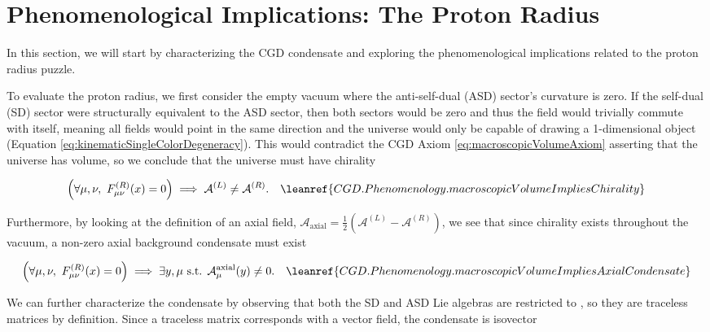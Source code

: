 
\section{Phenomenological Implications: The Proton Radius}
\label{sec:ProtonRadius}

In this section, we will start by characterizing the CGD condensate and exploring the phenomenological implications related to the proton radius puzzle.

To evaluate the proton radius, we first consider the empty vacuum where the anti-self-dual (ASD) sector's curvature is zero. If the self-dual (SD) sector were structurally equivalent to the ASD sector, then both sectors would be zero and thus the field would trivially commute with itself, meaning all fields would point in the same direction and the universe would only be capable of drawing a 1-dimensional object (Equation \ref{eq:kinematicSingleColorDegeneracy}). This would contradict the CGD Axiom \ref{eq:macroscopicVolumeAxiom} asserting that the universe has volume, so we conclude that the universe must have chirality

\begin{equation}
    \left( \forall \mu, \nu, \ F^{(R)}_{\mu\nu}(x) = 0 \right) \implies \mathcal{A}^{(L)} \neq \mathcal{A}^{(R)}.
    \quad \leanref{CGD.Phenomenology.macroscopicVolumeImpliesChirality}
    \label{eq:macroscopicVolumeImpliesChirality}
\end{equation}

\noindent Furthermore, by looking at the definition of an axial field, $\mathcal{A}_{\text{axial}} = \frac{1}{2}(\mathcal{A}^{(L)} - \mathcal{A}^{(R)})$, we see that since chirality exists throughout the vacuum, a non-zero axial background condensate must exist

\begin{equation}
    \left( \forall \mu, \nu, \ F^{(R)}_{\mu\nu}(x) = 0 \right) \implies \exists y, \mu \text{ s.t. } \mathcal{A}^{\text{axial}}_\mu(y) \neq 0.
    \quad \leanref{CGD.Phenomenology.macroscopicVolumeImpliesAxialCondensate}
    \label{eq:macroscopicVolumeImpliesAxialCondensate}
\end{equation}

We can further characterize the condensate by observing that both the SD and ASD Lie algebras are restricted to \slTwoCAlg, so they are traceless matrices by definition. Since a traceless matrix corresponds with a vector field, the condensate is isovector

